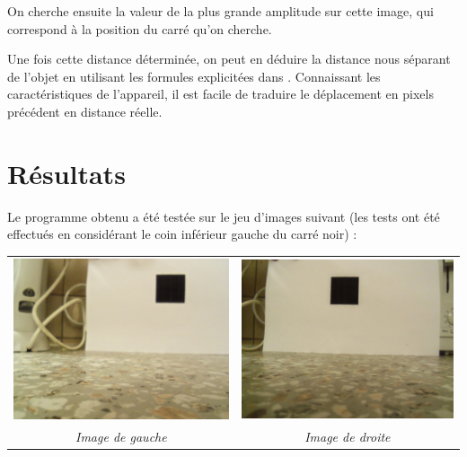 \documentclass[10pt,a4paper]{article}
\begin{document}
			On cherche ensuite la valeur de la plus grande amplitude sur cette image, qui correspond à la position du carré qu'on cherche.
		
		\bigskip
		
		Une fois cette distance déterminée, on peut en déduire la distance nous séparant de l'objet en utilisant les formules explicitées dans \cite{article}. Connaissant les caractéristiques de l'appareil, il est facile de traduire le déplacement en pixels précédent en distance réelle.
	
	\section{Résultats}
		Le programme obtenu a été testée sur le jeu d'images suivant (les tests ont été effectués en considérant le coin inférieur gauche du carré noir) :
		
		\begin{center}
			\begin{tabular}{cc}
				\includegraphics[scale=0.05]{Left.JPG} & \includegraphics[scale=0.05]{Right.JPG} \\
				\emph{Image de gauche} & \emph{Image de droite} \\
			\end{tabular}
		\end{center}
		
\end{document}
